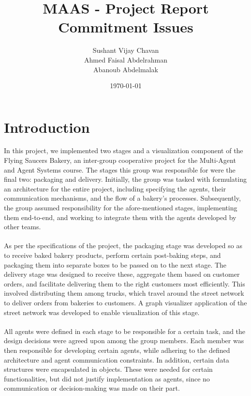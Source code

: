 \documentclass[11pt, a4paper]{article}
\title{MAAS - Project Report \\Commitment Issues}
\author{Sushant Vijay Chavan\\Ahmed Faisal Abdelrahman\\Abanoub Abdelmalak}
\date{\today}
\begin{document}
\maketitle
\newpage
\tableofcontents{}
\newpage

\section{Introduction}
\paragraph{}
In this project, we implemented two stages and a visualization component of the Flying Saucers Bakery, an inter-group cooperative project for the Multi-Agent and Agent Systems course. The stages this group was responsible for were the final two: packaging and delivery. Initially, the group was tasked with formulating an architecture for the entire project, including specifying the agents, their communication mechanisms, and the flow of a bakery's processes. Subsequently, the group assumed responsibility for the afore-mentioned stages, implementing them end-to-end, and working to integrate them with the agents developed by other teams.

\paragraph{}
As per the specifications of the project, the packaging stage was developed so as to receive baked bakery products, perform certain post-baking steps, and packaging them into separate boxes to be passed on to the next stage. The delivery stage was designed to receive these, aggregate them based on customer orders, and facilitate delivering them to the right customers most efficiently. This involved distributing them among trucks, which travel around the street network to deliver orders from bakeries to customers. A graph visualizer application of the street network was developed to enable visualization of this stage.

\paragraph{}
All agents were defined in each stage to be responsible for a certain task, and the design decisions were agreed upon among the group members. Each member was then responsible for developing certain agents, while adhering to the defined architecture and agent communication constraints. In addition, certain data structures were encapsulated in objects. These were needed for certain functionalities, but did not justify implementation as agents, since no communication or decision-making was made on their part.
\end{document}
